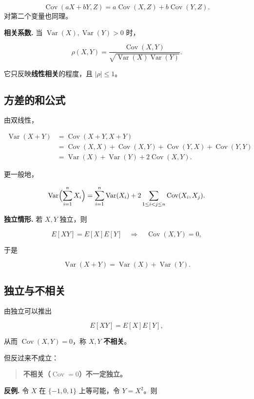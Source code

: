 \[
  \operatorname{Cov}(aX+bY,Z)
  =a\operatorname{Cov}(X,Z)+b\operatorname{Cov}(Y,Z).
\]
  对第二个变量也同理。

\textbf{相关系数.} 当 $\operatorname{Var}(X),\operatorname{Var}(Y)>0$ 时，

\[
\rho(X,Y)=\frac{\operatorname{Cov}(X,Y)}
{\sqrt{\operatorname{Var}(X)\operatorname{Var}(Y)}}.
\]

它只反映\textbf{线性相关}的程度，且 $|\rho|\le1$。

\subsection{方差的和公式}


由双线性，

\[
\begin{aligned}
\operatorname{Var}(X+Y)
&=\operatorname{Cov}(X+Y,X+Y)\\
&=\operatorname{Cov}(X,X)+\operatorname{Cov}(X,Y)
+\operatorname{Cov}(Y,X)+\operatorname{Cov}(Y,Y)\\
&=\operatorname{Var}(X)+\operatorname{Var}(Y)+2\operatorname{Cov}(X,Y).
\end{aligned}
\]

更一般地，

\[
\operatorname{Var}\Bigl(\sum_{i=1}^nX_i\Bigr)
=\sum_{i=1}^n\operatorname{Var}(X_i)
+2\sum_{1\le i<j\le n}\operatorname{Cov}(X_i,X_j).
\]

\textbf{独立情形.} 若 $X,Y$ 独立，则

\[
E[XY]=E[X]E[Y]\quad\Longrightarrow\quad
\operatorname{Cov}(X,Y)=0,
\]

于是

\[
\operatorname{Var}(X+Y)=\operatorname{Var}(X)+\operatorname{Var}(Y).
\]

\subsection{独立与不相关}


由独立可以推出

\[
E[XY]=E[X]E[Y],
\]

从而 $\operatorname{Cov}(X,Y)=0$，称 $X,Y$ \textbf{不相关}。

但反过来不成立：

\begin{quote}
\textbf{不相关（$\operatorname{Cov}=0$）不一定独立。}
\end{quote}


\textbf{反例.} 令 $X$ 在 $\{-1,0,1\}$ 上等可能，令 $Y=X^2$。则

